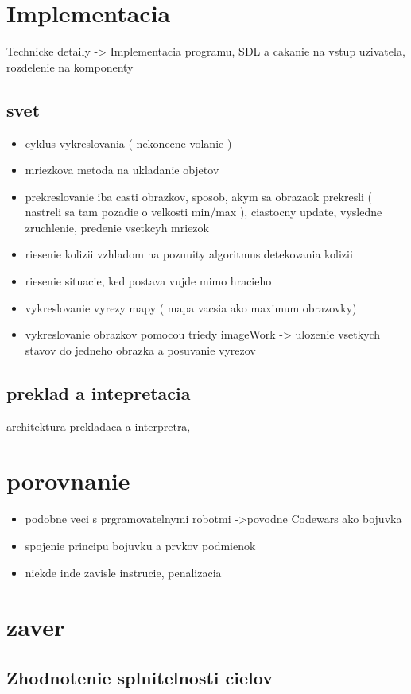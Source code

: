 \documentclass[a4paper,11pt,final]{report}
\begin{document}
\chapter{Implementacia}
Technicke detaily -> Implementacia programu, SDL a cakanie na vstup uzivatela, rozdelenie na komponenty
\section{svet}
\begin{itemize}
\item cyklus vykreslovania ( nekonecne volanie )
\item mriezkova metoda na ukladanie objetov
\item prekreslovanie iba casti obrazkov, sposob, akym  sa obrazaok prekresli ( nastreli sa tam pozadie o velkosti min/max ), ciastocny update, vysledne zruchlenie, predenie vsetkcyh mriezok
\item riesenie kolizii vzhladom na pozuuity algoritmus detekovania kolizii
\item riesenie situacie, ked postava vujde mimo hracieho
\item vykreslovanie vyrezy mapy ( mapa vacsia ako maximum obrazovky)
\item vykreslovanie obrazkov pomocou triedy imageWork -> ulozenie vsetkych stavov do jedneho obrazka a posuvanie vyrezov
\end{itemize}
\section{preklad a intepretacia}
architektura prekladaca a interpretra, 
\nopagebreak
\chapter{porovnanie}
\begin{itemize}
\item podobne veci s prgramovatelnymi robotmi ->povodne Codewars ako bojuvka
\item spojenie principu bojuvku a prvkov podmienok
\item niekde inde zavisle instrucie, penalizacia
\end{itemize}
\chapter{zaver}
\section{Zhodnotenie splnitelnosti cielov}
\end{document}
